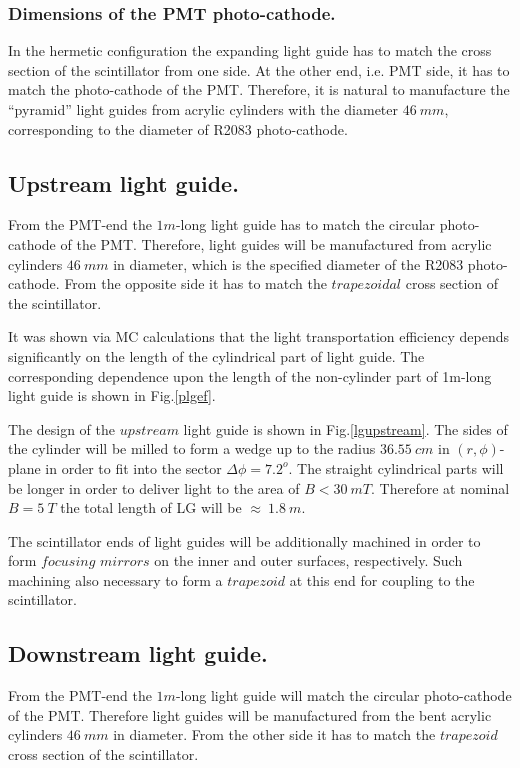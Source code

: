 \subsubsection{Dimensions of the PMT photo-cathode.}
In the hermetic configuration the expanding light guide
has 
to match the  cross section of  the scintillator from one side. 
At the other end, i.e. PMT side, it  
has to match the  photo-cathode of the PMT.
 Therefore, it is natural to manufacture the  ``pyramid''
light guides  from   acrylic cylinders with the diameter
$46~mm$, corresponding to  the diameter of  R2083 photo-cathode.


\subsection{Upstream light guide.} 
From the PMT-end the $1m$-long light guide 
has to match the circular photo-cathode of the PMT. Therefore,
light guides  will be   manufactured   from   acrylic cylinders 
$46~mm$ in diameter, which is the specified diameter of the R2083 photo-cathode.
From the opposite side it has to match the  $trapezoidal$ cross section  of the scintillator.

It was shown via MC calculations\cite{mutch} 
that the light transportation efficiency depends significantly on the 
length of the cylindrical part of light guide.
The corresponding dependence upon the length of the non-cylinder part of 1m-long light guide
is shown in Fig.\ref{plgef}.

The  design  of the $upstream$ light guide is shown in Fig.\ref{lgupstream}. 
The sides of the cylinder will be milled to form a wedge up to the radius $36.55~cm$ in $(r,\phi)$-plane
in order to fit into the  sector $\Delta \phi=7.2^o$. The straight cylindrical parts will be longer
in order to deliver  light to the area of $B<30~mT$. 
Therefore at nominal $B=5~T$ the total length of LG will be $\approx~1.8~m$.
 
The scintillator ends of light guides  will be additionally machined  in order 
to form  $focusing$ $mirrors$  on the inner and outer surfaces, respectively. 
Such machining  also necessary to form a  $trapezoid$ at this end  for coupling to the scintillator.

\subsection{Downstream light guide.}

From the PMT-end the $1m$-long light guide 
will  match the circular photo-cathode of the PMT. Therefore
light guides  will be   manufactured   from  the bent  acrylic cylinders 
$46~mm$ in diameter.
From the other side it has to match the $trapezoid$ cross section  of the scintillator.

